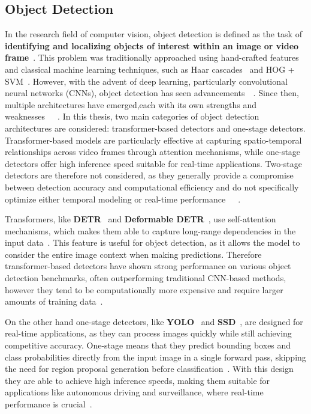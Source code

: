 \documentclass[final,twoside]{vutinfth}
\begin{document}
\subsection{Object Detection}
In the research field of computer vision, object detection is defined as the task of \textbf{identifying and localizing objects of interest within an image or video frame}~\cite{tasnim2023object}.
This problem was traditionally approached using hand-crafted features and classical machine learning techniques, such as Haar cascades~\cite{viola2001rapid} and HOG + SVM~\cite{dalal2005histograms}.
However, with the advent of deep learning, particularly convolutional neural networks (CNNs), object detection has seen advancements~\cite{girshick2014rich}~\cite{redmon2016yolo}.
Since then, multiple architectures have emerged,\newline each with its own strengths and weaknesses~\cite{zhu2021deformabledetr}~\cite{girshick2014rich}~\cite{redmon2016yolo}.
In this thesis, two main categories of object detection architectures are considered: transformer-based detectors and one-stage detectors.
Transformer-based models are particularly effective at capturing spatio-temporal relationships across video frames through attention mechanisms, while one-stage detectors offer high inference speed suitable for real-time applications.
Two-stage detectors are therefore not considered, as they generally provide a compromise between detection accuracy and computational efficiency and do not specifically optimize either temporal modeling or real-time performance~\cite{zhou2022transvod}~\cite{shi2022yolov}~\cite{zhu2017flowguidedfeatureaggregationvideo}.

Transformers, like \textbf{DETR}~\cite{carion2020endtoendobjectdetectiontransformers} and \textbf{Deformable DETR}~\cite{zhu2021deformabledetr}, use self-attention mechanisms, which makes them able to capture long-range dependencies in the input data~\cite{carion2020endtoendobjectdetectiontransformers}.
This feature is useful for object detection, as it allows the model to consider the entire image context when making predictions.
Therefore transformer-based detectors have shown strong performance on various object detection benchmarks, often outperforming traditional CNN-based methods, however they tend to be computationally more expensive and require larger amounts of training data~\cite{carion2020endtoendobjectdetectiontransformers}.

On the other hand one-stage detectors, like \textbf{YOLO}~\cite{redmon2016yolo} and \textbf{SSD}~\cite{liu2016ssd}, are designed for real-time applications, as they can process images quickly while still achieving competitive accuracy.
One-stage means that they predict bounding boxes and class probabilities directly from the input image in a single forward pass, skipping the need for region proposal generation before classification~\cite{redmon2016yolo}.
With this design they are able to achieve high inference speeds, making them suitable for applications like autonomous driving and surveillance, where real-time performance is crucial~\cite{redmon2017yolo9000}.
\end{document}
